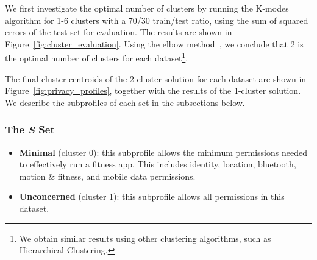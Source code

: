 We first investigate the optimal number of clusters by running the K-modes algorithm for 1-6 clusters with a 70/30 train/test ratio, using the sum of squared errors of the test set for evaluation. The results are shown in Figure~\ref{fig:cluster_evaluation}. Using the elbow method~\cite{kodinariya2013review}, we conclude that 2 is the optimal number of clusters for each dataset\footnote{We obtain similar results using other clustering algorithms, such as Hierarchical Clustering.}. 



The final cluster centroids of the 2-cluster solution for each dataset are shown in Figure~\ref{fig:privacy_profiles}, together with the results of the 1-cluster solution. %
We describe the subprofiles of each set in the subsections below.

%	
%	
%	


\subsubsection{The \textit{S} Set}
\begin{itemize}
	\item \textbf{Minimal} (cluster 0): this subprofile allows the minimum permissions needed to effectively run a fitness app. This includes identity, location, bluetooth, motion \& fitness, and mobile data permissions.
	
	\item \textbf{Unconcerned} (cluster 1): this subprofile allows all permissions in this dataset.
\end{itemize}

